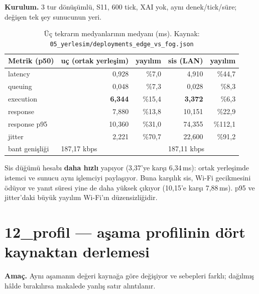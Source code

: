 \documentclass[11pt,a4paper]{report}
\newcommand{\ms}{\,ms}
\newcommand{\dosya}[1]{\texttt{\footnotesize #1}}
\begin{document}
\textbf{Kurulum.} 3 tur dönüşümlü, S11, 600 tick, XAI yok, aynı denek/tick/süre;
değişen tek şey sunucunun yeri.

\begin{table}[H]
\centering\small
\begin{tabular}{@{}lrrrr@{}}
\toprule
\textbf{Metrik (p50)} & \textbf{uç (ortak yerleşim)} & \textbf{yayılım} & \textbf{sis (LAN)} & \textbf{yayılım} \\
\midrule
latency         & 0{,}928  & \%7{,}0  & 4{,}910  & \%44{,}7 \\
queuing         & 0{,}048  & \%7{,}3  & 0{,}028  & \%8{,}3 \\
execution       & \textbf{6{,}344} & \%15{,}4 & \textbf{3{,}372} & \%6{,}3 \\
response        & 7{,}880  & \%13{,}8 & 10{,}151 & \%22{,}9 \\
response p95    & 10{,}360 & \%31{,}0 & 74{,}355 & \%112{,}1 \\
jitter          & 2{,}221  & \%70{,}7 & 22{,}600 & \%91{,}2 \\
bant genişliği  & \multicolumn{2}{l}{187{,}17 kbps} & \multicolumn{2}{l}{187{,}11 kbps} \\
\bottomrule
\end{tabular}
\caption{Üç tekrarın medyanlarının medyanı (ms).
Kaynak: \dosya{05\_yerlesim/deployments\_edge\_vs\_fog.json}}
\end{table}

\begin{bulgu}
Sis düğümü hesabı \textbf{daha hızlı} yapıyor (3{,}37'ye karşı 6{,}34\ms):
ortak yerleşimde istemci ve sunucu aynı işlemciyi paylaşıyor. Buna karşılık
sis, Wi-Fi gecikmesini ödüyor ve yanıt süresi yine de daha yüksek çıkıyor
(10{,}15'e karşı 7{,}88\ms). p95 ve jitter'daki büyük yayılım Wi-Fi'ın
düzensizliğidir.
\end{bulgu}

\section{12\_profil --- aşama profilinin dört kaynaktan derlemesi}

\textbf{Amaç.} Aynı aşamanın değeri kaynağa göre değişiyor ve sebepleri farklı;
dağılmış hâlde bırakılırsa makalede yanlış satır alıntılanır.
\end{document}
